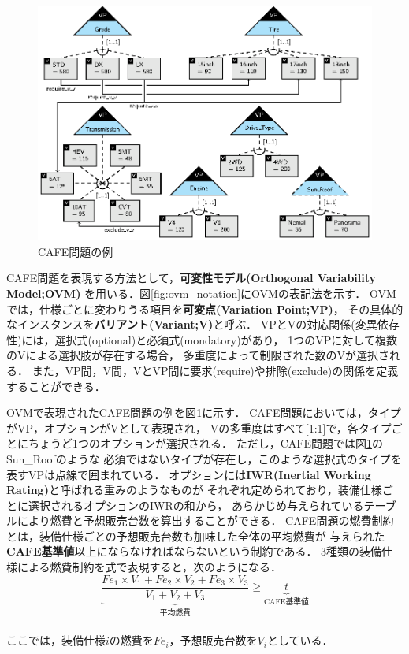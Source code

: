 \begin{figure}[tb]
 \centerline {\includegraphics[width=\linewidth]{images/ovm_example.eps}}
 \caption{CAFE問題の例}
 \label{fig:ovm_example}
\end{figure}

CAFE問題を表現する方法として，\textbf{可変性モデル(Orthogonal Variability Model;OVM)}
\cite{Pohl05:sple}を用いる．図\ref{fig:ovm_notation}にOVMの表記法を示す．
OVMでは，仕様ごとに変わりうる項目を\textbf{可変点(Variation Point;VP)}，
その具体的なインスタンスを\textbf{バリアント(Variant;V)}と呼ぶ．
VPとVの対応関係(変異依存性)には，選択式(optional)と必須式(mondatory)があり，
1つのVPに対して複数のVによる選択肢が存在する場合，
多重度によって制限された数のVが選択される．
また，VP間，V間，VとVP間に要求(require)や排除(exclude)の関係を定義することができる．



OVMで表現されたCAFE問題の例を図\ref{fig:ovm_example}に示す．
CAFE問題においては，タイプがVP，オプションがVとして表現され，
Vの多重度はすべて[1:1]で，各タイプごとにちょうど1つのオプションが選択される．
ただし，CAFE問題では図\ref{fig:ovm_example}のSun\_Roofのような
必須ではないタイプが存在し，このような選択式のタイプを表すVPは点線で囲まれている．
オプションには\textbf{IWR(Inertial Working Rating)}と呼ばれる重みのようなものが
それぞれ定められており，装備仕様ごとに選択されるオプションのIWRの和から，
あらかじめ与えられているテーブルにより燃費と予想販売台数を算出することができる．
CAFE問題の燃費制約とは，装備仕様ごとの予想販売台数も加味した全体の平均燃費が
与えられた\textbf{CAFE基準値}以上にならなければならないという制約である．
3種類の装備仕様による燃費制約を式で表現すると，次のようになる．
\vspace{1em}
 \begin{displaymath}
   \underbrace{
   \frac{Fe_{1} \times V_1 + Fe_{2} \times V_2 + Fe_{3} \times V_3 }{V_1 + V_2 + V_3}
   }_{\mbox{平均燃費}}
   \geq 
   \underbrace{t}_{\mbox{CAFE基準値}}
  \end{displaymath}
\vspace{1em}\\
ここでは，装備仕様$i$の燃費を$Fe_i$，予想販売台数を$V_i$としている．

